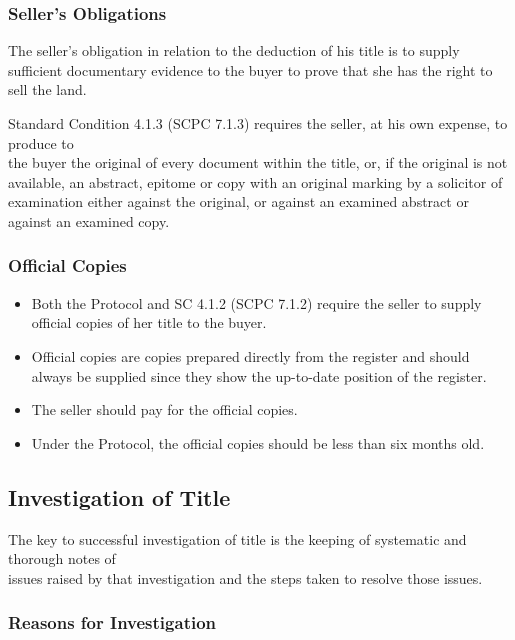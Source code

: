 \documentclass[
]{article}
\providecommand{\tightlist}{%
  \setlength{\itemsep}{0pt}\setlength{\parskip}{0pt}}
\begin{document}
\hypertarget{sellers-obligations}{%
\subsubsection{Seller's Obligations}\label{sellers-obligations}}

The seller's obligation in relation to the deduction of his title is to
supply sufficient documentary evidence to the buyer to prove that she
has the right to sell the land.

Standard Condition 4.1.3 (SCPC 7.1.3) requires the seller, at his own
expense, to produce to\\
the buyer the original of every document within the title, or, if the
original is not available, an abstract, epitome or copy with an original
marking by a solicitor of examination either against the original, or
against an examined abstract or against an examined copy.

\hypertarget{official-copies}{%
\subsubsection{Official Copies}\label{official-copies}}

\begin{itemize}
\tightlist
\item
  Both the Protocol and SC 4.1.2 (SCPC 7.1.2) require the seller to
  supply official copies of her title to the buyer.
\item
  Official copies are copies prepared directly from the register and
  should always be supplied since they show the up-to-date position of
  the register.
\item
  The seller should pay for the official copies.
\item
  Under the Protocol, the official copies should be less than six months
  old.
\end{itemize}

\hypertarget{investigation-of-title}{%
\subsection{Investigation of Title}\label{investigation-of-title}}

The key to successful investigation of title is the keeping of
systematic and thorough notes of\\
issues raised by that investigation and the steps taken to resolve those
issues.

\hypertarget{reasons-for-investigation}{%
\subsubsection{Reasons for
Investigation}\label{reasons-for-investigation}}
\end{document}
